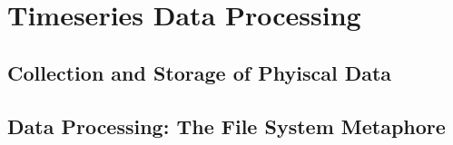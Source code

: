
\chapter{Timeseries Data Processing}

\section{Collection and Storage of Phyiscal Data}

\section{Data Processing: The File System Metaphore}


